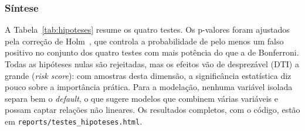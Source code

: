 \subsubsection{Síntese}

A Tabela~\ref{tab:hipoteses} resume os quatro testes. Os p-valores foram ajustados pela
correção de Holm~\cite{holm}, que controla a probabilidade de pelo menos um falso positivo no conjunto dos
quatro testes com mais potência do que a de Bonferroni. Todas as hipóteses nulas são
rejeitadas, mas os efeitos vão de desprezável (DTI) a grande (\textit{risk score}): com
amostras desta dimensão, a significância estatística diz pouco sobre a importância prática.
Para a modelação, nenhuma variável isolada separa bem o \textit{default}, o que sugere modelos
que combinem várias variáveis e possam captar relações não lineares. Os resultados completos,
com o código, estão em \texttt{reports/testes\_hipoteses.html}.
